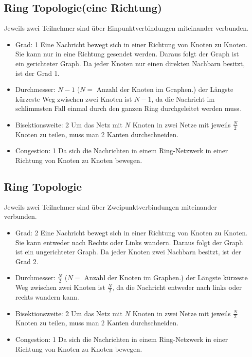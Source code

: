 \subsection{Ring Topologie(eine Richtung)}
 Jeweils zwei Teilnehmer sind über Einpunktverbindungen miteinander verbunden.
\begin{itemize}
  \item Grad: 1
  \newline Eine Nachricht bewegt sich in einer Richtung von Knoten zu Knoten. Sie kann nur in eine Richtung gesendet werden. Daraus folgt der Graph ist ein gerichteter Graph. Da jeder Knoten nur einen direkten Nachbarn besitzt, ist der Grad 1.
  \item Durchmesser: $N-1$ ($N =$ Anzahl der Knoten im Graphen.)
   \newline der Längste kürzeste Weg zwischen zwei Knoten ist $N-1$, da die Nachricht im schlimmsten Fall einmal durch den ganzen Ring durchgeleitet werden muss.
  \item Bisektionsweite: 2
  \newline  Um das Netz mit $N$ Knoten in zwei Netze mit jeweils $\frac{N}{2}$ Knoten zu teilen, muss man 2 Kanten durchschneiden.
  \item Congestion: 1
  \newline Da sich die Nachrichten in einem Ring-Netzwerk in einer Richtung von Knoten zu Knoten bewegen.   
\end{itemize}

\subsection{Ring Topologie}
 Jeweils zwei Teilnehmer sind über Zweipunktverbindungen miteinander verbunden.
\begin{itemize}
  \item Grad: 2
  \newline Eine Nachricht bewegt sich in einer Richtung von Knoten zu Knoten. Sie kann entweder nach Rechts oder Links wandern. Daraus folgt der Graph ist ein ungerichteter Graph. Da jeder Knoten zwei Nachbarn besitzt, ist der Grad 2.
  \item Durchmesser: $\frac{N}{2}$ ($N =$ Anzahl der Knoten im Graphen.)
   \newline der Längste kürzeste Weg zwischen zwei Knoten ist $\frac{N}{2}$, da die Nachricht entweder nach links oder rechts wandern kann.
  \item Bisektionsweite: 2
  \newline  Um das Netz mit $N$ Knoten in zwei Netze mit jeweils $\frac{N}{2}$ Knoten zu teilen, muss man 2 Kanten durchschneiden.
  \item Congestion: 1
  \newline Da sich die Nachrichten in einem Ring-Netzwerk in einer Richtung von Knoten zu Knoten bewegen.   
\end{itemize}

